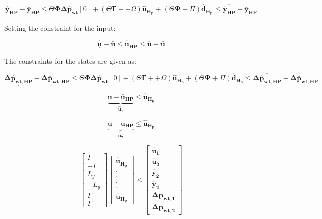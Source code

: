 \begin{equation}
	\underline{\bm{\hat{y}_{HP}}} - \bm{\bar{y}_{HP}} \leq \Theta \bm{\Phi} \bm{\Delta \hat{p}_{wt}}[0] +  (\Theta \bm{\Gamma}+ + \Omega) \bm{\hat{u}_{H_p}} + (\Theta \bm{\Psi} + \Pi)  \bm{\hat{d}_{H_p}} \leq \overline{\bm{\hat{y}_{HP}}} - \bm{\bar{y}_{HP}}
\end{equation}

Setting the constraint for the input:

\begin{equation}
\underline{\bm{\hat{u}}} - \bm{\bar{u}} \leq \bm{\hat{u}_{HP}} \leq \overline{\bm{{u}}} - \bm{\bar{u}}
\end{equation}

The constraints for the states are given as:

\begin{equation}
	\underline{\bm{\Delta \hat{p}_{wt,HP}}} - \bm{\Delta \bar{p}_{wt,HP}} \leq \Theta \bm{\Phi} \bm{\Delta \hat{p}_{wt}}[0] +  (\Theta \bm{\Gamma}+ + \Omega) \bm{\hat{u}_{H_p}} + (\Theta \bm{\Psi} + \Pi)  \bm{\hat{d}_{H_p}} \leq \overline{\bm{\Delta \hat{p}_{wt,HP}}} - \bm{\Delta \bar{p}_{wt,HP}} 
\end{equation}

\begin{equation}
\underbrace{\underline{\bm{u}} - \bm{\bar{u}_{HP}}}_{\bm{\hat{u}_{1}}} \leq \bm{\hat{u}_{H_p}}
\end{equation}

\begin{equation}
	\underbrace{\overline{\bm{{u}}} - \bm{\bar{u}_{HP}}}_{\bm{\hat{u}_{2}}} \leq \bm{\hat{u}_{H_p}}
\end{equation}


\begin{equation}
	\begin{bmatrix}
		I 	\\
		-I 	\\
		L_{y}	\\
		-L_{y}	\\
		\Gamma	\\
		\Gamma
	\end{bmatrix}
	\begin{bmatrix}
			\bm{\hat{u}_{H_p}}	\\
			\cdot 		\\
			\cdot 		\\
			\cdot 		\\
			\cdot 		\\
			\bm{\hat{u}_{H_p}}
	\end{bmatrix}
	\leq 
	\begin{bmatrix}
			\bm{\hat{u}_{1}}	\\
			\bm{\hat{u}_{2}}	\\
			\bm{\hat{y}_{2}}	\\
			\bm{\hat{y}_{2}}	\\
			\bm{\Delta \bar{p}_{wt,1}}	\\
			\bm{\Delta \bar{p}_{wt,2}}	
	\end{bmatrix}
\end{equation}


